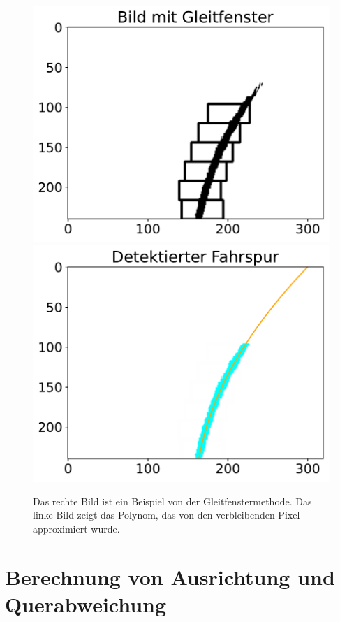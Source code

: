 \documentclass[arbeit=studie,oneside,BCOR=12mm]{ArbeitRST}
\begin{document}
\begin{figure}[h]
    \centering
    \includegraphics[scale=0.47]{before_filter}
    \includegraphics[scale=0.47]{after_filter}
    \caption{Das rechte Bild ist ein Beispiel von der Gleitfenstermethode. Das linke Bild
    zeigt das Polynom, das von den verbleibenden Pixel approximiert wurde.}
    \label{gleit}
\end{figure}

\section{Berechnung von Ausrichtung und Querabweichung}
\end{document}
